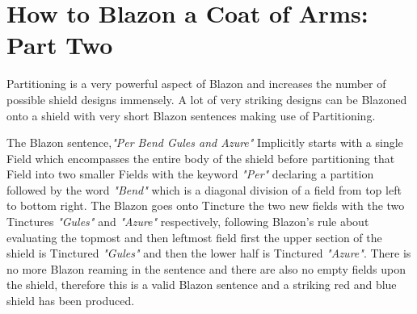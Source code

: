 \section{How to Blazon a Coat of Arms: Part Two}
Partitioning is a very powerful aspect of Blazon and increases the number of possible shield designs immensely.  A lot of very striking designs can be Blazoned onto a shield with very short Blazon sentences making use of Partitioning.  

The Blazon sentence,\emph{"Per Bend Gules and Azure"} Implicitly starts with a single Field which encompasses the entire body of the shield before partitioning that Field into two smaller Fields with the keyword \emph{"Per"} declaring a partition followed by the word \emph{"Bend"} which is a diagonal division of a field from top left to bottom right.  The Blazon goes onto Tincture the two new fields with the two Tinctures \emph{"Gules"} and \emph{"Azure"} respectively,  following Blazon's rule about evaluating the topmost and then leftmost field first the upper section of the shield is Tinctured \emph{"Gules"} and then the lower half is Tinctured \emph{"Azure"}.  There is no more Blazon reaming in the sentence and there are also no empty fields upon the shield, therefore this is a valid Blazon sentence and a striking red and blue shield has been produced. 



